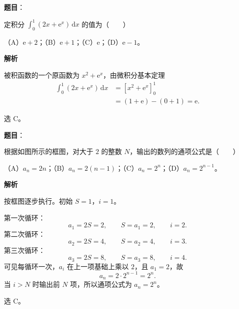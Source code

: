 \begin{answer}

\textbf{题目}：

定积分 $\displaystyle\int_0^1(2x+\mathrm e^x)\,\mathrm dx$ 的值为\mbox{（　　）}

（A）$\mathrm e+2$；（B）$\mathrm e+1$；（C）$\mathrm e$；（D）$\mathrm e-1$。

\textbf{解析}

被积函数的一个原函数为 $x^2+\mathrm e^x$，由微积分基本定理
\nopagebreak[4]
\[\begin{aligned}
\int_0^1(2x+\mathrm e^x)\,\mathrm dx
&=\left[x^2+\mathrm e^x\right]_0^1\\
&=(1+\mathrm e)-(0+1)=\mathrm e.
\end{aligned}\]

选 C。


\end{answer}
\begin{answer}

\textbf{题目}：

根据如图所示的框图，对大于 $2$ 的整数 $N$，输出的数列的通项公式是\mbox{（　　）}
\nopagebreak[4]
\begin{center}\end{center}
\nopagebreak[4]
（A）$a_n=2n$；（B）$a_n=2(n-1)$；（C）$a_n=2^n$；（D）$a_n=2^{n-1}$。

\textbf{解析}

按框图逐步执行。初始 $S=1$，$i=1$。

第一次循环：
\nopagebreak[4]
\[a_1=2S=2,\qquad S=a_1=2,\qquad i=2.\]
第二次循环：
\nopagebreak[4]
\[a_2=2S=4,\qquad S=a_2=4,\qquad i=3.\]
第三次循环：
\nopagebreak[4]
\[a_3=2S=8,\qquad S=a_3=8,\qquad i=4.\]
可见每循环一次，$a_i$ 在上一项基础上乘以 $2$，且 $a_1=2$，故
\nopagebreak[4]
\[a_n=2\cdot2^{n-1}=2^n.\]
当 $i>N$ 时输出前 $N$ 项，所以通项公式为 $a_n=2^n$。

选 C。


\end{answer}

